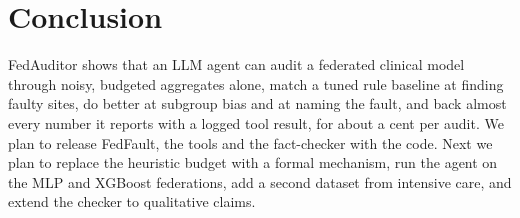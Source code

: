 \documentclass[conference]{IEEEtran}
\begin{document}
\section{Conclusion}

FedAuditor shows that an LLM agent can audit a federated clinical model through noisy, budgeted
aggregates alone, match a tuned rule baseline at finding faulty sites, do better at subgroup bias and
at naming the fault, and back almost every number it reports with a logged tool result, for about a
cent per audit. We plan to release FedFault, the tools and the fact-checker with the code. Next we plan to
replace the heuristic budget with a formal mechanism, run the agent on the MLP and XGBoost
federations, add a second dataset from intensive care, and extend the checker to qualitative claims.



\end{document}
